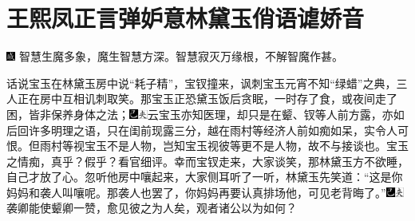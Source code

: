 

\chapter{王熙凤正言弹妒意\hspace{.5em}林黛玉俏语谑娇音}

{\includegraphics[width=3mm]{../Images/00005}  \kaishu 智慧生魔多象，魔生智慧方深。智慧寂灭万缘根，不解智魔作甚。}


话说宝玉在林黛玉房中说“耗子精”，宝钗撞来，讽刺宝玉元宵不知“绿蜡”之典，三人正在房中互相讥刺取笑。那宝玉正恐黛玉饭后贪眠，一时存了食，或夜间走了困，皆非保养身体之法；{\includegraphics[width=3mm]{../Images/00003}\includegraphics[width=3mm]{../Images/00012}\footnotesize \kaishu 云宝玉亦知医理，却只是在颦、钗等人前方露，亦如后回许多明理之语，只在闺前现露三分，越在雨村等经济人前如痴如呆，实令人可恨。但雨村等视宝玉不是人物，岂知宝玉视彼等更不是人物，故不与接谈也。宝玉之情痴，真乎？假乎？看官细评。}幸而宝钗走来，大家谈笑，那林黛玉方不欲睡，自己才放了心。忽听他房中嚷起来，大家侧耳听了一听，林黛玉先笑道：“这是你妈妈和袭人叫嚷呢。那袭人也罢了，你妈妈再要认真排场他，可见老背晦了。”{\includegraphics[width=3mm]{../Images/00003}\includegraphics[width=3mm]{../Images/00012}\footnotesize \kaishu 袭卿能使颦卿一赞，愈见彼之为人矣，观者诸公以为如何？}

